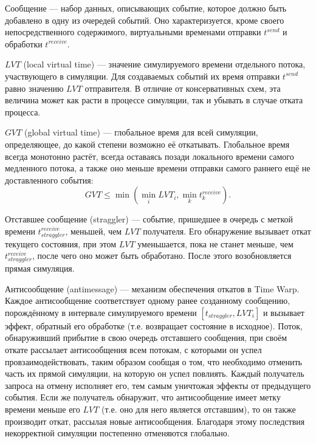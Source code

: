 \begin{itemize*}
    \item Сообщение --- набор данных, описывающих событие, которое должно быть добавлено в одну из очередей событий. Оно характеризуется, кроме своего непосредственного содержимого, виртуальными временами отправки $t^{send}$ и обработки $t^{receive}$.
    \item $LVT$ (\abbr local virtual time) --- значение симулируемого времени отдельного потока, участвующего в симуляции. Для создаваемых событий их время отправки $t^{send}$ равно значению $LVT$ отправителя. В отличие от консервативных схем, эта величина может как расти в процессе симуляции, так и убывать в случае отката процесса.
    \item $GVT$ (\abbr global virtual time) --- глобальное время для всей симуляции, определяющее, до какой степени возможно её откатывать.  Глобальное время всегда монотонно растёт, всегда оставаясь позади локального времени самого медленного потока, а также оно меньше времени отправки самого раннего ещё не доставленного события:
    $$GVT \leq \min \left( \min\limits_{i} LVT_{i}, \min\limits_{k} t^{receive}_k  \right).$$
    \item Отставшее сообщение (\abbr straggler) --- событие, пришедшее в очередь с меткой времени $t^{receive}_{straggler}$, меньшей, чем $LVT$ получателя. Его обнаружение вызывает откат текущего состояния, при этом $LVT$ уменьшается, пока не станет меньше, чем $t^{receive}_{straggler}$, после чего оно может быть обработано. После этого возобновляется прямая симуляция.
    \item Антисообщение (\abbr antimessage) --- механизм обеспечения откатов в Time Warp. Каждое антисообщение соответствует одному ранее созданному сообщению, порождённому в интервале симулируемого времени $[t_{straggler}, LVT_i]$ и  вызывает эффект, обратный его обработке (т.е. возвращает состояние в исходное). Поток, обнаруживший прибытие в свою очередь отставшего сообщения, при своём откате рассылает антисообщения всем потокам, с которыми он успел провзаимодействовать, таким образом сообщая о том, что необходимо отменить часть их прямой симуляции, на которую он успел повлиять. Каждый получатель запроса на отмену исполняет его, тем самым уничтожая эффекты от предыдущего события. Если же получатель обнаружит, что антисообщение имеет метку времени меньше его $LVT$ (т.е. оно для него является отставшим), то он также производит откат, рассылая новые антисообщения. Благодаря этому последствия некорректной симуляции постепенно отменяются глобально.
    

\end{itemize*}
